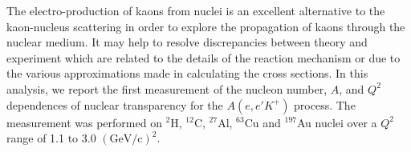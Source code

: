 %
The electro-production of kaons from nuclei is an excellent alternative to the kaon-nucleus scattering in order to explore the propagation of kaons through the nuclear medium. It may help to resolve discrepancies between theory and experiment which are related to the details of the reaction mechanism or due to the various approximations made in calculating the cross sections. In this analysis, we report the first measurement of the nucleon number, $A$, and $Q^2$ dependences of nuclear transparency for the $A(e,e'K^+)$ process. The measurement was performed on $^{2}$H, $^{12}$C, $^{27}$Al, $^{63}$Cu and $^{197}$Au nuclei over a  $Q^2$ range of 1.1 $\mathrm{to}$ 3.0 $(\mathrm{GeV/c})^2$.

